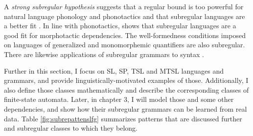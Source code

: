 A \emph{strong subregular hypothesis} suggests that a regular bound is too powerful for natural language phonology and phonotactics and that subregular languages are a better fit \citep{Heinz10ldp}.
In line with phonotactics, \cite{AksenovaEtAl16} shows that subregular languages are a good fit for morphotactic dependencies.
The well-formedness conditions imposed on languages of generalized and monomorphemic quantifiers are also subregular.
There are likewise applications of subregular grammars to syntax  \citep{Graf17Rutgerstalk,DeSantoGrafDrury2017,VuEtAl19SCiL}.

Further in this section, I focus on SL, SP, TSL and MTSL languages and grammars, and provide linguistically-motivated examples of those.
Additionally, I also define those classes mathematically and describe the corresponding classes of finite-state automata.
Later, in chapter 3, I will model those and some other dependencies, and show how their subregular grammars can be learned from real data.
Table \ref{fig:subrepattenslfg} summarizes patterns that are discussed further and subregular classes to which they belong.


